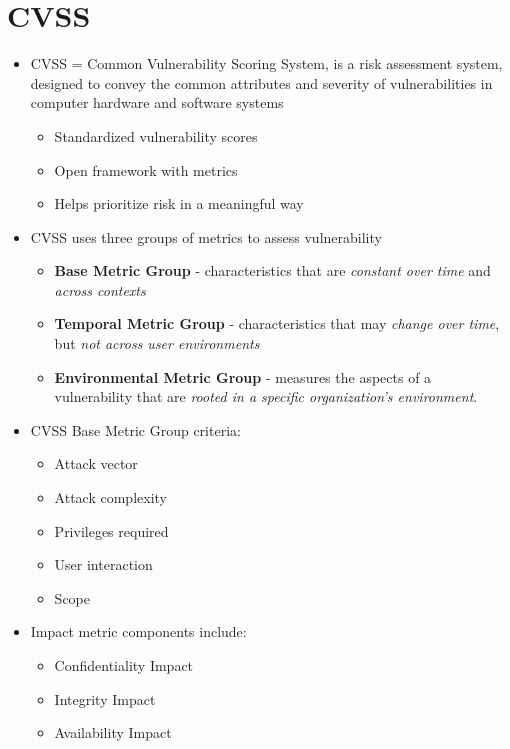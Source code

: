 \documentclass[a4paper]{article}
\begin{document}
\section{CVSS}





\begin{itemize}
    \item CVSS = Common Vulnerability Scoring System, is a risk assessment system, designed to convey the common attributes and severity of vulnerabilities in computer hardware and software systems
    \begin{itemize}
        \item Standardized vulnerability scores
        \item Open framework with metrics
        \item Helps prioritize risk in a meaningful way
    \end{itemize}
    \item CVSS uses three groups of metrics to assess vulnerability
    \begin{itemize}
        \item \textbf{Base Metric Group} - characteristics that are \textit{constant over time} and \textit{across contexts}
        \item \textbf{Temporal Metric Group} - characteristics that may \textit{change over time}, but \textit{not across user environments}
        \item \textbf{Environmental Metric Group} - measures the aspects of a vulnerability that are \textit{rooted in a specific organization’s environment}. 
    \end{itemize}
    \item CVSS Base Metric Group criteria:
    \begin{itemize}
        \item Attack vector
        \item Attack complexity
        \item Privileges required
        \item User interaction
        \item Scope
    \end{itemize}
    \item Impact metric components include:
    \begin{itemize}
        \item Confidentiality Impact
        \item Integrity Impact
        \item Availability Impact
    \end{itemize}
\end{itemize}
\end{document}
